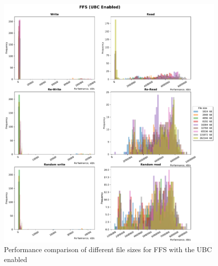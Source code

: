 \begin{figure}[!htb]
	\label{fig:bench_ffs_with_cache}
	\begin{center}
		\includegraphics[width=1.0\textwidth]{figures.nosync/benchmarking/FFS/FFS-UBC Enabled-hist.pdf}
	\end{center}
	\caption{Performance comparison of different file sizes for FFS with the UBC enabled}
\end{figure}

